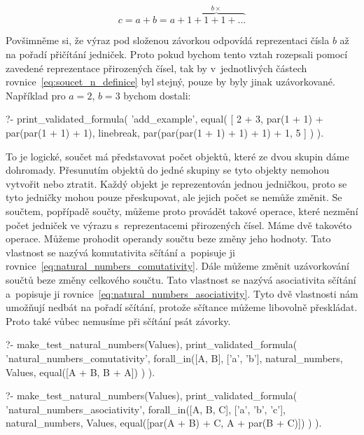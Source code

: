 \begin{equation}
\label{eq:soucet_n_definice}
c = a + b = a + \overbrace{1 + 1 + 1 + ...}^{b \times}
\end{equation}

Povšimněme si, že výraz pod složenou závorkou odpovídá reprezentaci čísla \(b\) až na pořadí přičítání jedniček. Proto pokud bychom tento vztah rozepsali pomocí zavedené reprezentace přirozených čísel, tak by  v~jednotlivých částech rovnice~\eqref{eq:soucet_n_definice} byl stejný, pouze by byly jinak uzávorkované. Například pro \(a=2\), \(b=3\) bychom dostali:

\begin{prolog}
?-	print_validated_formula(
		'add_example',
		equal(
			[
				2 + 3,
				par(1 + 1) + par(par(1 + 1) + 1),
				linebreak,
				par(par(par(1 + 1) + 1) + 1) + 1,
				5
			]
		)
	).
\end{prolog}

To je logické, součet má představovat počet objektů, které ze dvou skupin dáme dohromady. Přesunutím objektů do jedné skupiny se tyto objekty nemohou vytvořit nebo ztratit. Každý objekt je reprezentován jednou jedničkou, proto se tyto jedničky mohou pouze přeskupovat, ale jejich počet se nemůže změnit. Se součtem, popřípadě součty, můžeme proto provádět takové operace, které nezmění počet jedniček ve výrazu s~reprezentacemi přirozených čísel. Máme dvě takovéto operace. Můžeme prohodit operandy součtu beze změny jeho hodnoty. Tato vlastnost se nazývá komutativita sčítání a~popisuje ji rovnice~\eqref{eq:natural_numbers_comutativity}. Dále můžeme změnit uzávorkování součtů beze změny celkového součtu. Tato vlastnost se nazývá asociativita sčítání a~popisuje ji rovnice~\eqref{eq:natural_numbers_asociativity}. Tyto dvě vlastnosti nám umožňují nedbát na pořadí sčítání, protože sčítance můžeme libovolně přeskládat. Proto také vůbec nemusíme při sčítání psát závorky.

\begin{fact}
\begin{prolog}
?-	make_test_natural_numbers(Values),
	print_validated_formula(
		'natural_numbers_comutativity',
		forall_in([A, B], ['a', 'b'], natural_numbers, Values,
			equal([A + B, B + A])
		)
	).
\end{prolog}
\begin{prolog}
?-	make_test_natural_numbers(Values),
	print_validated_formula(
		'natural_numbers_asociativity',
		forall_in([A, B, C], ['a', 'b', 'c'], natural_numbers, Values,
			equal([par(A + B) + C, A + par(B + C)])
		)
	).
\end{prolog}
\end{fact}

